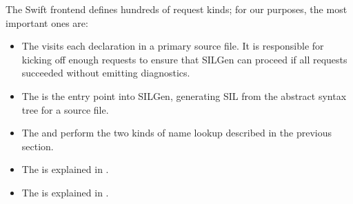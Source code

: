 \documentclass[../generics]{subfiles}
\begin{document}
The Swift frontend defines hundreds of request kinds; for our purposes, the most important ones are:
\begin{itemize}
\item The  visits each declaration in a primary source file. It is responsible for kicking off enough requests to ensure that SILGen can proceed if all requests succeeded without emitting diagnostics.
\item The  is the entry point into SILGen, generating SIL from the abstract syntax tree for a source file.
\item The  and  perform the two kinds of name lookup described in the previous section.
\item The  is explained in .
\item The  is explained in .
\end{itemize}
\end{document}
